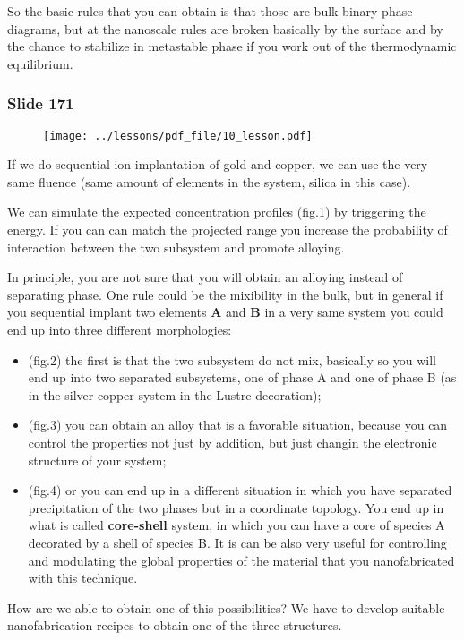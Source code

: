 \documentclass[../main/main.tex]{subfiles}
\begin{document}
So the basic rules that you can obtain is that those are bulk binary phase diagrams, but at the nanoscale rules are broken basically by the surface and by the chance to stabilize in metastable phase if you work out of the thermodynamic equilibrium.

\newpage

\subsubsection{Slide 171}

\begin{figure}[h!]
\centering
\texttt{[image: ../lessons/pdf\_file/10\_lesson.pdf]}
\end{figure}

If we do sequential ion implantation of gold and copper, we can use the very same fluence (same amount of elements in the system, silica in this case).

We can simulate the expected concentration profiles (fig.1) by triggering the energy. If you can can match the projected range you increase the probability of interaction between the two subsystem and promote alloying.

In principle, you are not sure that you will obtain an alloying instead of separating phase. One rule could be the mixibility in the bulk, but in general if you sequential implant two elements \textbf{A} and \textbf{B} in a very same system you could end up into three different morphologies:
\begin{itemize}
\item (fig.2) the first is that the two subsystem do not mix, basically so you will end up into two separated subsystems, one of phase A and one of phase B (as in the silver-copper system in the Lustre decoration);
\item (fig.3) you can obtain an alloy that is a favorable situation, because you can control the properties not just by addition, but just changin the electronic structure of your system;
\item (fig.4) or you can end up in a different situation in which you have separated precipitation of the two phases but in a coordinate topology. You end up in what is called \textbf{core-shell} system, in which you can have a core of species A decorated by a shell of species B. It is can be also very useful for controlling and modulating the global properties of the material that you nanofabricated with this technique.
\end{itemize}
How are we able to obtain one of this possibilities? We have to develop suitable nanofabrication recipes to obtain one of the three structures.
\end{document}
